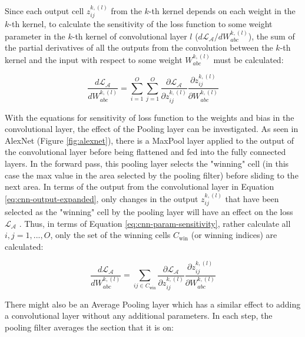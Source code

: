 Since each output cell $z_{ij}^{k, (l)}$ from the $k$-th kernel depends on each weight in the $k$-th kernel, to calculate the sensitivity of the loss function to some weight parameter in the $k$-th kernel of convolutional layer $l$ ($d\mathcal{L}_\mathcal{A}/dW_{abc}^{k, (l)}$), the sum of the partial derivatives of all the outputs from the convolution between the $k$-th kernel and the input with respect to some weight $W_{abc}^{k, (l)}$ must be calculated:

\begin{equation}
    \label{eq:cnn-param-sensitivity}
    \frac{d\mathcal{L}_\mathcal{A}}{dW_{abc}^{k, (l)}} = \sum_{i=1}^{O} \sum_{j=1}^{O} \frac{\partial \mathcal{L}_\mathcal{A}}{\partial z_{ij}^{k, (l)}} \frac{\partial z_{ij}^{k, (l)}}{\partial W_{abc}^{k, (l)}}
\end{equation}

With the equations for sensitivity of loss function to the weights and bias in the convolutional layer, the effect of the Pooling layer can be investigated. As seen in AlexNet (Figure \ref{fig:alexnet}), there is a MaxPool layer applied to the output of the convolutional layer before being flattened and fed into the fully connected layers. In the forward pass, this pooling layer selects the "winning" cell (in this case the max value in the area selected by the pooling filter) before sliding to the next area. In terms of the output from the convolutional layer in Equation \ref{eq:cnn-output-expanded}, only changes in the output $z_{ij}^{k, (l)}$ that have been selected as the "winning" cell by the pooling layer will have an effect on the loss $\mathcal{L}_\mathcal{A}$ \cite{zakariaBackpropagationCNNMathematically2020}. Thus, in terms of Equation \ref{eq:cnn-param-sensitivity}, rather calculate all $i, j = 1,...,O$, only the set of the winning cells $C_{\text{win}}$ (or winning indices) are calculated:

\begin{equation}
    \label{eq:backprop-pool}
    \frac{d\mathcal{L}_\mathcal{A}}{dW_{abc}^{k, (l)}} = \sum_{ij \in C_{\text{win}}} \frac{\partial \mathcal{L}_\mathcal{A}}{\partial z_{ij}^{k, (l)}} \frac{\partial z_{ij}^{k, (l)}}{\partial W_{abc}^{k, (l)}} 
\end{equation}

There might also be an Average Pooling layer which has a similar effect to adding a convolutional layer without any additional parameters. In each step, the pooling filter averages the section that it is on:

